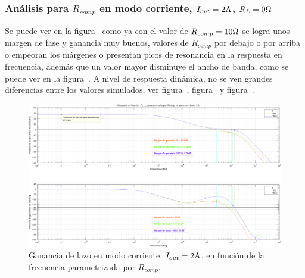 \clearpage


\subsubsection{Análisis para $R_{comp}$ en modo corriente, $I_{out} = 2 \si[per-mode=symbol]{\ampere}$, $R_{L} = 0 \si[per-mode=symbol]{\ohm}$}

Se puede ver en la figura~ como ya con el valor de $R_{comp} = 10 \si[per-mode=symbol]{\ohm}$ se logra unos margen de fase y ganancia muy buenos, valores de $R_{comp}$ por debajo o por arriba o empeoran los márgenes o presentan picos de resonancia en la respuesta en frecuencia, además que un valor mayor disminuye el ancho de banda, como se puede ver en la figura~. A nivel de respuesta dinámica, no se ven grandes diferencias entre los valores simulados, ver figura~, figura~ y figura~.

\vfill



\clearpage

\begin{figure}[H] %
\begin{center}
\includegraphics[width=1.1 \textwidth, angle=90]{./img/plots/loop/power_supply_RCOMP_LOOP_Modo3.png}
\caption{\label{fig:fig_power_supply_RCOMP_LOOP_Modo3}\footnotesize{Ganancia de lazo en modo corriente, $I_{out} = 2 \si[per-mode=symbol]{\ampere}$, en función de la frecuencia parametrizada por $R_{comp}$.}}
\end{center}
\end{figure}


